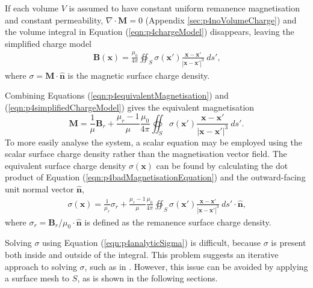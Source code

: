 If each volume \(V\) is assumed to have constant uniform remanence magnetisation and constant permeability, \(\nabla \cdot \mathbf{M} = 0\) (Appendix \ref{sec:p4noVolumeCharge}) and the volume integral in Equation (\ref{eqn:p4chargeModel}) disappears, leaving the simplified charge model
\begin{align}\label{eqn:p4simplifiedChargeModel}
    \mathbf{B}\left( \mathbf{x} \right) = \frac{\mu_0}{4\pi} \oiint_{S} \sigma \left( \mathbf{x}' \right) \frac{\mathbf{x} - \mathbf{x}'}{\left| \mathbf{x} - \mathbf{x}' \right|^3} \ ds' \text{,}
\end{align}
where \(\sigma = \mathbf{M} \cdot \hat{\mathbf{n}}\) is the magnetic surface charge density.

Combining Equations (\ref{eqn:p4equivalentMagnetisation}) and (\ref{eqn:p4simplifiedChargeModel}) gives the equivalent magnetisation
\begin{equation}\label{eqn:p4badMagnetisationEquation}
    \mathbf{M} = \frac{1}{\mu} \mathbf{B}_r + \frac{\mu_r - 1}{\mu} \frac{\mu_0}{4\pi} \oiint_{S} \sigma \left( \mathbf{x}' \right) \frac{\mathbf{x} - \mathbf{x}'}{\left| \mathbf{x} - \mathbf{x}' \right|^3} \ ds' \text{.}
\end{equation}
To more easily analyse the system, a scalar equation may be employed using the scalar surface charge density rather than the magnetisation vector field. The equivalent surface charge density \(\sigma \left( \mathbf{x} \right)\) can be found by calculating the dot product of Equation (\ref{eqn:p4badMagnetisationEquation}) and the outward-facing unit normal vector \(\hat{\mathbf{n}}\),
\begin{align}\label{eqn:p4analyticSigma}
    \sigma \left( \mathbf{x} \right) = \frac{1}{\mu_r} \sigma_r + \frac{\mu_r - 1}{\mu} \frac{\mu_0}{4\pi} \oiint_{S} \sigma \left( \mathbf{x}' \right) \frac{\mathbf{x} - \mathbf{x}'}{\left| \mathbf{x} - \mathbf{x}' \right|^3} \ ds' \cdot \hat{\mathbf{n}} \text{,}
\end{align}
where \(\sigma_r = \mathbf{B}_r/\mu_0 \cdot \hat{\mathbf{n}}\) is defined as the remanence surface charge density.

Solving \(\sigma\) using Equation (\ref{eqn:p4analyticSigma}) is difficult, because \(\sigma\) is present both inside and outside of the integral. This problem suggests an iterative approach to solving \(\sigma\), such as in \cite{Casteren2014}. However, this issue can be avoided by applying a surface mesh to \(S\), as is shown in the following sections.

